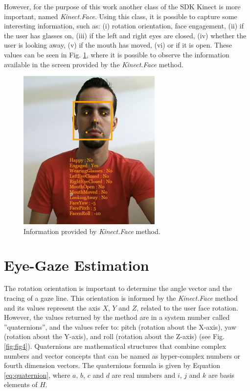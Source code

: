 \documentclass[10pt, conference]{IEEEtran}
\begin{document}
	However, for the purpose of this work another class of the SDK Kinect is more important, named \emph{Kinect.Face}. 
	Using this class, it is possible to capture some interesting information, such as: (i) rotation orientation, face engagement, (ii) if the user has glasses on, (iii) if the left and right eyes are closed, (iv) whether the user is looking away, (v) if the mouth has moved, (vi) or if it is open. 
	These values can be seen in Fig. \ref{fig:fig3}, where it is possible to observe the information available in the screen provided by the \emph{Kinect.Face} method.

    \begin{figure}[t]
        \centering
        \includegraphics{figures/pic3.png}
        \caption{Information provided by \emph{Kinect.Face} method.}
        \label{fig:fig3}
    \end{figure}

\section{Eye-Gaze Estimation} \label{sec:eyeGazeEstimation}

	The rotation orientation is important to determine the angle vector and the tracing of a gaze line. 
	This orientation is informed by the \emph{Kinect.Face} method and its values represent the axis $X$, $Y$ and $Z$, related to the user face rotation. 
	However, the values returned by the method are in a system number called ''quaternions'', and the values refer to: pitch (rotation about the X-axis), yaw (rotation about the Y-axis), and roll (rotation about the Z-axis) (see Fig. \ref{fig:fig4}). 
	Quaternions are mathematical structures that combine complex numbers and vector concepts \cite{2,11} that can be named as hyper-complex numbers or fourth dimension vectors. 
	The quaternions formula is given by Equation \ref{eq:quaternion}, where $a$, $b$, $c$ and $d$ are real numbers and $i$, $j$ and $k$ are basis elements of $H$.
    
\end{document}
